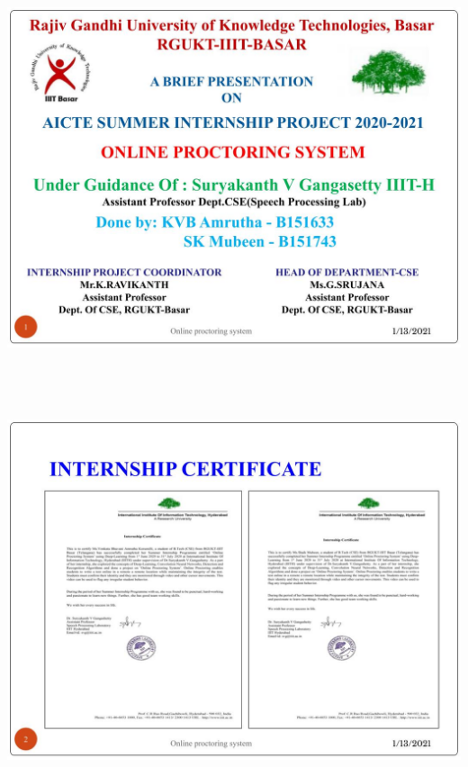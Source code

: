 \documentclass[12pt]{report}
\begin{document}
\noindent
\includegraphics[width=17cm,height=12cm]{INTERNSHIP SAMPLE PRESENTATION}\\
\includegraphics[width=17cm,height=12cm]{INTERNSHIP SAMPLE PRESENTATION (1)}\\
\end{document}
